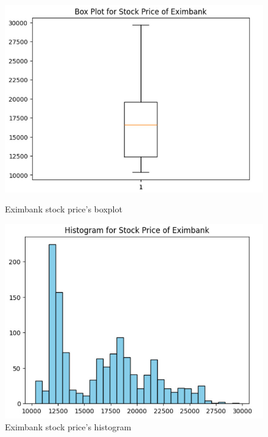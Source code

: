 \begin{figure}[H]
    \centering
    \begin{minipage}{0.23\textwidth}
    \centering
    \includegraphics[width=1\textwidth]{resources/chapter-3/Boxplot_Eximbank.jpg}
    \caption{Eximbank stock price's boxplot}
    \label{fig:eximbank_boxplot}
    \end{minipage}
    \hfill
    \begin{minipage}{0.23\textwidth}
    \centering
    \includegraphics[width=1\textwidth]{resources/chapter-3/Histogram_Eximbank.jpg}
    \caption{Eximbank stock price's histogram}
    \label{fig:eximbank_histogram}
    \end{minipage}
\end{figure}

